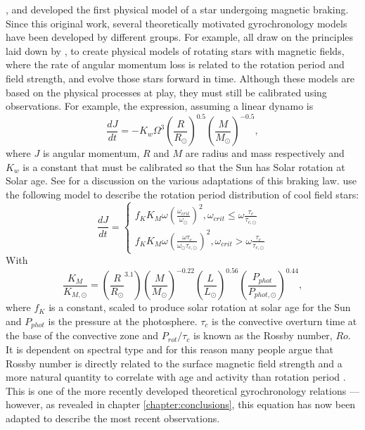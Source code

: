 \citet{Weber1967}, \citet{Mestel1987} and \citet{Kawaler1988} developed the first physical model of a star undergoing
magnetic braking.
Since this original work, several theoretically motivated gyrochronology
models have been developed by different groups.
For example, \citet{Collier-cameron1994, Reiners2012, Vansaders2013,
Epstein2014} all draw on the principles laid down by \citet{Kawaler1988}, to
create physical models of rotating stars with magnetic fields, where the rate
of angular momentum loss is related to the rotation period and field strength,
and evolve those stars forward in time.
Although these models are based on the physical processes at play, they must
still be calibrated using observations.
For example, the \citet{Kawaler1988} expression, assuming a linear dynamo is
\begin{equation}
\frac{dJ}{dt} = -K_w\Omega^3\left(\frac{R}{R_\odot}\right)^{0.5}
\left(\frac{M}{M_\odot}\right)^{-0.5},
\end{equation}
where $J$ is angular momentum, $R$ and $M$ are radius and mass respectively
and $K_w$ is a constant that must be calibrated so that the Sun has Solar
rotation at Solar age.
See \citet{Barnes2010b} for a discussion on the various adaptations of this
braking law.
\citet{Vansaders2013} use the following model to describe the rotation period
distribution of cool field stars:
\begin{equation}
\frac{dJ}{dt} = \left\{
                \begin{array}{ll}
                  f_K K_M \omega \left( \frac{\omega_{crit}}{\omega_\odot}
                  \right)^2, \omega_{crit} \leq \omega
                  \frac{\tau_{c}}{\tau_{c, \odot}} \\
                  f_K K_M \omega \left( \frac{\omega\tau_{c}}
                  {\omega_\odot\tau_{c, \odot}}
                  \right)^2, \omega_{crit} > \omega
                  \frac{\tau_{c}}{\tau_{c, \odot}}
                \end{array}
              \right.
\end{equation}
\label{eq:vansaders}
With
\begin{equation}
    \frac{K_M}{K_{M, \odot}} = \left(\frac{R}{R_\odot}^{3.1}\right)
    \left(\frac{M}{M_\odot}\right)^{-0.22}
    \left(\frac{L}{L_\odot}\right)^{0.56}
    \left(\frac{P_{phot}}{P_{phot, \odot}}\right)^{0.44},
\end{equation}
\label{eq:vansaders2}
where $f_K$ is a constant, scaled to produce solar rotation at solar age for
the Sun and $P_{phot}$ is the pressure at the photosphere.
$\tau_c$ is the convective overturn time at the base of the convective zone
and $P_{rot}/\tau_c$ is known as the Rossby number, $Ro$.
It is dependent on spectral type and for this reason many people argue that
Rossby number is directly related to the surface magnetic field strength and a
more natural quantity to correlate with age and activity than rotation period
\citep[\eg][]{Vansaders2016} \citep[although this view is not universally
held --- see, \eg][]{Reiners2014}.
This is one of the more recently developed theoretical gyrochronology
relations --- however, as revealed in chapter \ref{chapter:conclusions}, this
equation has now been adapted to describe the most recent observations.

